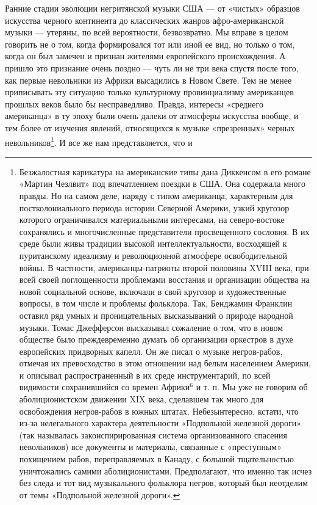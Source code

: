 Ранние стадии эволюции негритянской музыки  США — от «чистых» образцов
искусства черного континента  до классических жанров афро-американской
музыки  —  утеряны,  по  всей  вероятности,  безвозвратно.  Мы  вправе
в  целом  говорить   не  о  том,  когда  формировался   тот  или  иной
ее  вид,   но  только  о   том,  когда   он  был  замечен   и  признан
жителями  европейского происхождения.  А  пришло  это признание  очень
поздно  —  чуть  ли  не  три   века  спустя  после  того,  как  первые
невольники  из  Африки   высадились  в  Новом  Свете.   Тем  не  менее
приписывать эту ситуацию только культурному провинциализму американцев
прошлых  веков  было  бы  несправедливо.  Правда,  интересы  «среднего
американца»  в  ту эпоху  были  очень  далеки от  атмосферы  искусства
вообще,  и  тем  более  от  изучения  явлений,  относящихся  к  музыке
«презренных»  черных  невольников\footnote{Безжалостная карикатура  на
американские  типы  дана  Диккенсом  в  его  романе  «Мартин  Чезлвит»
под  впечатлением   поездки  в   США.  Она  содержала   много  правды.
Но  на  самом  деле,  наряду   с  типом  американца,  характерным  для
постколониального  периода истории  Северной  Америки, узкий  кругозор
которого  ограничивался  материальными интересами,  на  северо-востоке
сохранялись и  многочисленные представители просвещенного  сословия. В
их  среде были  живы традиции  высокой интеллектуальности,  восходящей
к  пуританскому идеализму  и  революционной атмосфере  освободительной
войны. В  частности, американцы-патриоты  второй половины  XVIII века,
при  всей  своей  поглощенности  проблемами  восстания  и  организации
общества  на  новой социальной  основе,  включали  в свой  кругозор  и
художественные  вопросы,  в  том  числе  и  проблемы  фольклора.  Так,
Бенджамин Франклин  оставил ряд умных и  проницательных высказываний о
природе народной музыки. Томас  Джефферсон высказывал сожаление о том,
что  в  новом  обществе  было  преждевременно  думать  об  организации
оркестров  в  духе  европейских  придворных  капелл.  Он  же  писал  о
музыке  негров-рабов,  отмечая  их   превосходство  в  этом  отношении
над  белым  населением  Америки,  и  описывал  распространенный  в  их
среде  инструментарий,  по  всей  видимости  сохранившийся  со  времен
Африки$^6$  и т.  п. Мы  уже не  говорим об  аболиционистском движении
XIX  века,  сделавшем  так   много  для  освобождения  негров-рабов  в
южных   штатах.  Небезынтересно,   кстати,   что  из-за   нелегального
характера  деятельности «Подпольной  железной дороги»  (так называлась
законспирированная система  организованного спасения  невольников) все
документы  и материалы,  связанные  с  «преступным» похищением  рабов,
переправляемых в  Канаду, с большой тщательностью  уничтожались самими
аболиционистами. Предполагают,  что именно так  исчез без следа  и тот
вид  музыкального  фольклора негров,  который  был  неотделим от  темы
«Подпольной железной  дороги».}. И  все же  нам представляется,  что и
